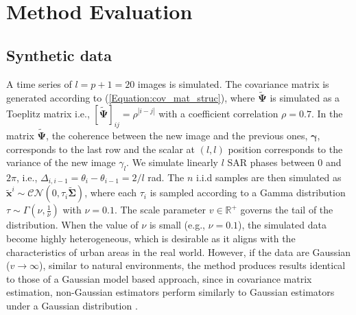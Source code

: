 \section{Method Evaluation} %
    \label{section:simu}
    \noindent
    \vspace{-1cm}
    \subsection{Synthetic data}
        \label{subsection:simu_param}
        \noindent
        A time series of $l = p + 1 = 20$ images is simulated. The covariance matrix is generated according to (\ref{Equation:cov_mat_struc}), where $\mathbf{\tilde{\Psi}}$ is simulated as a Toeplitz matrix i.e.,  $[ \mathbf{\tilde{\Psi}}]_{ij} = \rho^{|i-j|}$ with a coefficient correlation $\rho = 0.7$. %
        In the matrix $\mathbf{\tilde{\Psi}}$,  the coherence between the new image and the previous ones, $\boldsymbol{\gamma}$, corresponds to the last row and the scalar at $(l, l)$ position corresponds to the variance of the new image $\gamma_{l}$. We simulate linearly $l$ \acs{SAR} phases between $0$ and $2 \pi$, i.e., $\Delta_{i, i-1} = \theta_i - \theta_{i-1} = 2/l$ rad. The $n$ \acs{i.i.d} samples are then simulated as $\mathbf{\tilde{x}}^i \sim\mathcal{CN}(0, \tau_i \mathbf{\tilde{\Sigma}})$, where each $\tau_i$ is sampled according to a Gamma distribution $\tau \sim \Gamma(\nu, \frac{1}{\nu})$ with $\nu = 0.1$. %
        The scale parameter  $v \in \mathbb{R}^+$ governs the tail of the distribution. When the value of $\nu$ is small (e.g., $\nu = 0.1$), the simulated data become highly heterogeneous, which is desirable as it aligns with the characteristics of urban areas in the real world. However, if the data are Gaussian ($v \rightarrow \infty$), similar to natural environments, the method produces results identical to those of a Gaussian model based approach, since in covariance matrix estimation, non-Gaussian estimators perform similarly to Gaussian estimators under a Gaussian distribution \citep{pascal2008empirical, harari2008use}.%
